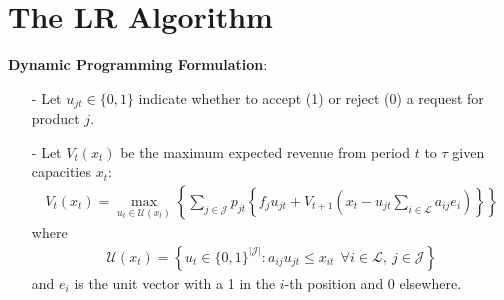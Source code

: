 \documentclass[11pt]{article}
\begin{document}
\vspace{0.5cm}



\newpage


\section{The LR Algorithm}

\noindent
\textbf{Dynamic Programming Formulation}:
\begin{itemize}[itemsep=0pt,parsep=0pt]
\item[-] Let $u_{jt}\in\{0,1\}$ indicate whether to accept (1) or reject (0) a request for product $j$.
\item[-] Let $V_t(x_t)$ be the maximum expected revenue from period $t$ to $\tau$ given capacities $x_t$:
    \begin{align*}
        V_t(x_t) = \max_{u_t \in \mathcal{U}(x_t)} 
            \left\{ \sum_{j\in \mathcal{J}} p_{jt} 
            \left\{ 
                f_j u_{jt} + 
                V_{t+1} \left(x_t - u_{jt}\sum_{i\in \mathcal{L}}a_{ij}e_i\right) 
            \right\} \right\} 
        \tag{DP1}
    \end{align*}
    where
    \begin{align*}
        \mathcal{U}(x_t) = \left\{ 
            u_{t} \in \{0,1\}^{|\mathcal{J}|} : 
            a_{ij} u_{jt} \le x_{it} \ \ 
            \forall i \in \mathcal{L}, \ j \in \mathcal{J}
        \right\} 
    \end{align*}
    and $e_i$ is the unit vector with a 1 in the $i$-th position and 0 elsewhere.
\end{itemize}

\vspace{0.5cm}
\end{document}
